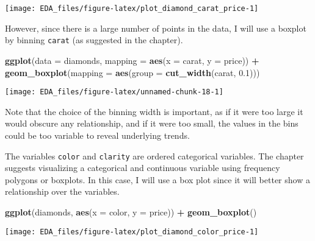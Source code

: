 \documentclass[]{book}
\newenvironment{Shaded}{\begin{snugshade}}{\end{snugshade}}
\newcommand{\DataTypeTok}[1]{\textcolor[rgb]{0.13,0.29,0.53}{#1}}
\newcommand{\FloatTok}[1]{\textcolor[rgb]{0.00,0.00,0.81}{#1}}
\newcommand{\KeywordTok}[1]{\textcolor[rgb]{0.13,0.29,0.53}{\textbf{#1}}}
\newcommand{\NormalTok}[1]{#1}
\newcommand{\OperatorTok}[1]{\textcolor[rgb]{0.81,0.36,0.00}{\textbf{#1}}}
\newcommand{\StringTok}[1]{\textcolor[rgb]{0.31,0.60,0.02}{#1}}
\theoremstyle{plain}
\theoremstyle{remark}
\begin{document}
\begin{center}\texttt{[image: EDA\_files/figure-latex/plot\_diamond\_carat\_price-1]} \end{center}

However, since there is a large number of points in the data, I will use
a boxplot by binning \texttt{carat} (as suggested in the chapter).

\begin{Shaded}
\begin{Highlighting}[]
\KeywordTok{ggplot}\NormalTok{(}\DataTypeTok{data =}\NormalTok{ diamonds, }\DataTypeTok{mapping =} \KeywordTok{aes}\NormalTok{(}\DataTypeTok{x =}\NormalTok{ carat, }\DataTypeTok{y =}\NormalTok{ price)) }\OperatorTok{+}
\StringTok{  }\KeywordTok{geom_boxplot}\NormalTok{(}\DataTypeTok{mapping =} \KeywordTok{aes}\NormalTok{(}\DataTypeTok{group =} \KeywordTok{cut_width}\NormalTok{(carat, }\FloatTok{0.1}\NormalTok{)))}
\end{Highlighting}
\end{Shaded}

\begin{center}\texttt{[image: EDA\_files/figure-latex/unnamed-chunk-18-1]} \end{center}

Note that the choice of the binning width is important, as if it were
too large it would obscure any relationship, and if it were too small,
the values in the bins could be too variable to reveal underlying
trends.

The variables \texttt{color} and \texttt{clarity} are ordered
categorical variables. The chapter suggests visualizing a categorical
and continuous variable using frequency polygons or boxplots. In this
case, I will use a box plot since it will better show a relationship
over the variables.

\begin{Shaded}
\begin{Highlighting}[]
\KeywordTok{ggplot}\NormalTok{(diamonds, }\KeywordTok{aes}\NormalTok{(}\DataTypeTok{x =}\NormalTok{ color, }\DataTypeTok{y =}\NormalTok{ price)) }\OperatorTok{+}
\StringTok{  }\KeywordTok{geom_boxplot}\NormalTok{()}
\end{Highlighting}
\end{Shaded}

\begin{center}\texttt{[image: EDA\_files/figure-latex/plot\_diamond\_color\_price-1]} \end{center}
\end{document}
